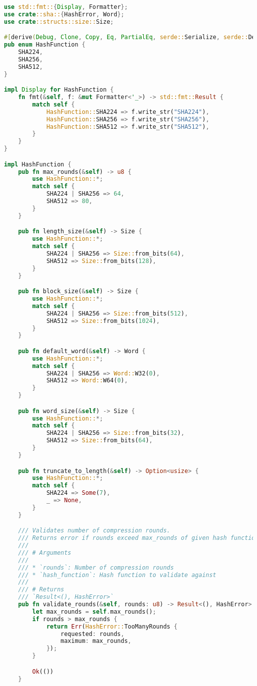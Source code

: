 \begin{lstlisting}[language=rust, caption={structs/hash\_function.rs}]
use std::fmt::{Display, Formatter};
use crate::sha::{HashError, Word};
use crate::structs::size::Size;

#[derive(Debug, Clone, Copy, Eq, PartialEq, serde::Serialize, serde::Deserialize, clap::ValueEnum)]
pub enum HashFunction {
	SHA224,
	SHA256,
	SHA512,
}

impl Display for HashFunction {
	fn fmt(&self, f: &mut Formatter<'_>) -> std::fmt::Result {
		match self {
			HashFunction::SHA224 => f.write_str("SHA224"),
			HashFunction::SHA256 => f.write_str("SHA256"),
			HashFunction::SHA512 => f.write_str("SHA512"),
		}
	}
}

impl HashFunction {
	pub fn max_rounds(&self) -> u8 {
		use HashFunction::*;
		match self {
			SHA224 | SHA256 => 64,
			SHA512 => 80,
		}
	}

	pub fn length_size(&self) -> Size {
		use HashFunction::*;
		match self {
			SHA224 | SHA256 => Size::from_bits(64),
			SHA512 => Size::from_bits(128),
		}
	}

	pub fn block_size(&self) -> Size {
		use HashFunction::*;
		match self {
			SHA224 | SHA256 => Size::from_bits(512),
			SHA512 => Size::from_bits(1024),
		}
	}

	pub fn default_word(&self) -> Word {
		use HashFunction::*;
		match self {
			SHA224 | SHA256 => Word::W32(0),
			SHA512 => Word::W64(0),
		}
	}

	pub fn word_size(&self) -> Size {
		use HashFunction::*;
		match self {
			SHA224 | SHA256 => Size::from_bits(32),
			SHA512 => Size::from_bits(64),
		}
	}

	pub fn truncate_to_length(&self) -> Option<usize> {
		use HashFunction::*;
		match self {
			SHA224 => Some(7),
			_ => None,
		}
	}

	/// Validates number of compression rounds.
	/// Returns error if rounds exceed max_rounds of given hash function.
	///
	/// # Arguments
	///
	/// * `rounds`: Number of compression rounds
	/// * `hash_function`: Hash function to validate against
	///
	/// # Returns
	/// `Result<(), HashError>`
	pub fn validate_rounds(&self, rounds: u8) -> Result<(), HashError> {
		let max_rounds = self.max_rounds();
		if rounds > max_rounds {
			return Err(HashError::TooManyRounds {
				requested: rounds,
				maximum: max_rounds,
			});
		}

		Ok(())
	}


\end{lstlisting}
